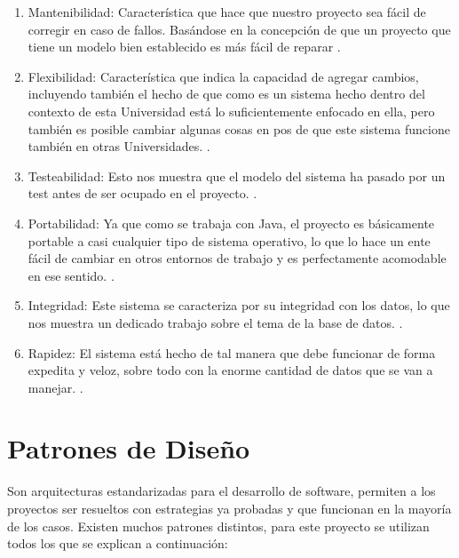 \documentclass[a4paper,12pt,openany,oneside]{book}
\begin{document}
\begin{enumerate}

\item Mantenibilidad: Característica que hace que nuestro proyecto sea fácil de corregir en caso de fallos. Basándose en la concepción de que un proyecto que tiene un modelo bien establecido es más fácil de reparar \cite{data11}.

\item Flexibilidad: Característica que indica la capacidad de agregar cambios, incluyendo también el hecho de que como es un sistema hecho dentro del contexto de esta Universidad está lo suficientemente enfocado en ella, pero también es posible cambiar algunas cosas en pos de que este sistema funcione también en otras Universidades. \cite{data11}.

\item Testeabilidad: Esto nos muestra que el modelo del sistema ha pasado por un test antes de ser ocupado en el proyecto. \cite{data11}.

\item Portabilidad: Ya que como se trabaja con Java, el proyecto es básicamente portable a casi cualquier tipo de sistema operativo, lo que lo hace un ente fácil de cambiar en otros entornos de trabajo y es perfectamente acomodable en ese sentido. \cite{data11}.

\item Integridad: Este sistema se caracteriza por su integridad con los datos, lo que nos muestra un dedicado trabajo sobre el tema de la base de datos. \cite{data11}.

\item Rapidez: El sistema está hecho de tal manera que debe funcionar de forma expedita y veloz, sobre todo con la enorme cantidad de datos que se van a manejar. \cite{data11}.

\end{enumerate}

\section{Patrones de Diseño}
Son arquitecturas estandarizadas para el desarrollo de software, permiten a los proyectos ser resueltos con estrategias ya probadas y que funcionan en la mayoría de los casos. Existen muchos patrones distintos, para este proyecto se utilizan todos los que se explican a continuación:
\end{document}
